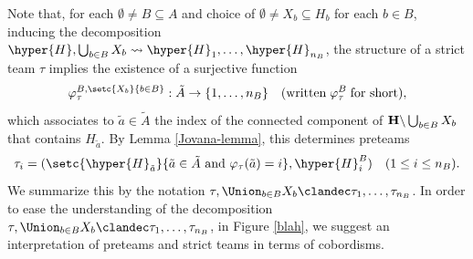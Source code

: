 Note that, for each $\emptyset\neq B\subseteq A$ and choice of $\emptyset\neq X_b\subseteq H_b$ for each $b\in B$,  inducing the decomposition $\hyper{H}, \bigcup_{b\in B}X_b\leadsto \hyper{H}_1, \ldots, \hyper{H}_{n_B}$,
  the structure of a strict team $\tau$ implies the existence of a surjective function 
$$\varphi^{B,\setc{X_b}{b\in B}}_{\tau}:\tilde{A}\rightarrow \{1,\dots,n_B\} \quad(\mbox{written}\; \varphi^{B}_{\tau}\;\mbox{for short}),$$  which associates to  $\tilde{a}\in \tilde{A}$ the  index   of the connected component  of ${\bf H}\backslash \bigcup_{b\in B}X_b$ that contains $H_{\tilde{a}}$.  By Lemma \ref{Jovana-lemma}, this determines  preteams $$\tau_i =(\setc{\hyper{H}_{\tilde{a}}}{\tilde{a}\in \tilde{A} \mbox{ and } \varphi_{\tau}(\tilde{a})=i},\hyper{H}^B_i) \quad (1\leq i\leq n_B).$$ 
We summarize this by the notation $\tau,\Union_{b\in B}X_b\clandec \tau_1,\ldots,\tau_{n_B}$.  In order to ease the understanding of the decomposition $\tau,\Union_{b\in B}X_b\clandec \tau_1,\ldots,\tau_{n_B}$,   in Figure \ref{blah}, we suggest an interpretation of preteams and strict teams in terms of cobordisms. 

